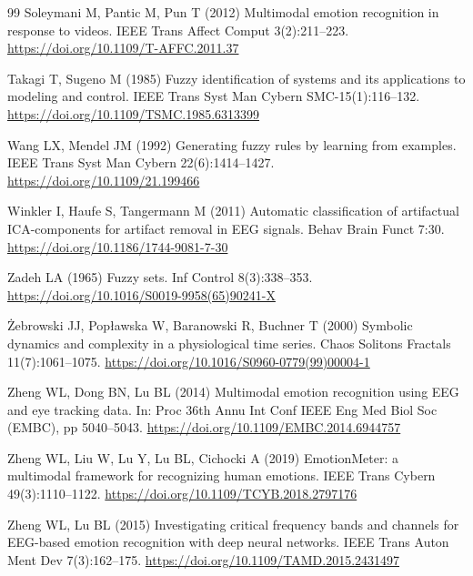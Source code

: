 \begin{thebibliography}{99}
 Soleymani M, Pantic M, Pun T (2012) Multimodal emotion recognition in response to videos. IEEE Trans Affect Comput 3(2):211--223. \url{https://doi.org/10.1109/T-AFFC.2011.37}

 Takagi T, Sugeno M (1985) Fuzzy identification of systems and its applications to modeling and control. IEEE Trans Syst Man Cybern SMC-15(1):116--132. \url{https://doi.org/10.1109/TSMC.1985.6313399}

 Wang LX, Mendel JM (1992) Generating fuzzy rules by learning from examples. IEEE Trans Syst Man Cybern 22(6):1414--1427. \url{https://doi.org/10.1109/21.199466}

 Winkler I, Haufe S, Tangermann M (2011) Automatic classification of artifactual ICA-components for artifact removal in EEG signals. Behav Brain Funct 7:30. \url{https://doi.org/10.1186/1744-9081-7-30}

 Zadeh LA (1965) Fuzzy sets. Inf Control 8(3):338--353. \url{https://doi.org/10.1016/S0019-9958(65)90241-X}

 \.Zebrowski JJ, Pop\l awska W, Baranowski R, Buchner T (2000) Symbolic dynamics and complexity in a physiological time series. Chaos Solitons Fractals 11(7):1061--1075. \url{https://doi.org/10.1016/S0960-0779(99)00004-1}

 Zheng WL, Dong BN, Lu BL (2014) Multimodal emotion recognition using EEG and eye tracking data. In: Proc 36th Annu Int Conf IEEE Eng Med Biol Soc (EMBC), pp 5040--5043. \url{https://doi.org/10.1109/EMBC.2014.6944757}

 Zheng WL, Liu W, Lu Y, Lu BL, Cichocki A (2019) EmotionMeter: a multimodal framework for recognizing human emotions. IEEE Trans Cybern 49(3):1110--1122. \url{https://doi.org/10.1109/TCYB.2018.2797176}

 Zheng WL, Lu BL (2015) Investigating critical frequency bands and channels for EEG-based emotion recognition with deep neural networks. IEEE Trans Auton Ment Dev 7(3):162--175. \url{https://doi.org/10.1109/TAMD.2015.2431497}

\end{thebibliography}
